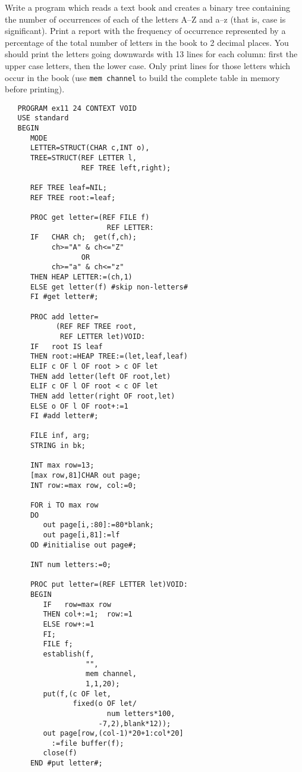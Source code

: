\begin{exercise}
\item Write a program which reads a text book and creates a binary tree
containing the number of occurrences of each of the letters A--Z and
a--z (that is, case is significant). Print a report with the frequency
of occurrence represented by a percentage of the total number of
letters in the book to 2 decimal places. You should print the letters
going downwards with 13 lines for each column: first the upper case
letters, then the lower case. Only print lines for those letters which
occur in the book (use \verb|mem channel| to build the complete table in
memory before printing).\ans \ %
\begin{verbatim}
   PROGRAM ex11 24 CONTEXT VOID
   USE standard
   BEGIN
      MODE
      LETTER=STRUCT(CHAR c,INT o),
      TREE=STRUCT(REF LETTER l,
                  REF TREE left,right);

      REF TREE leaf=NIL;
      REF TREE root:=leaf;

      PROC get letter=(REF FILE f)
                        REF LETTER:
      IF   CHAR ch;  get(f,ch);
           ch>="A" & ch<="Z"
                  OR
           ch>="a" & ch<="z"
      THEN HEAP LETTER:=(ch,1)
      ELSE get letter(f) #skip non-letters#
      FI #get letter#;

      PROC add letter=
            (REF REF TREE root,
             REF LETTER let)VOID:
      IF   root IS leaf
      THEN root:=HEAP TREE:=(let,leaf,leaf)
      ELIF c OF l OF root > c OF let
      THEN add letter(left OF root,let)
      ELIF c OF l OF root < c OF let
      THEN add letter(right OF root,let)
      ELSE o OF l OF root+:=1
      FI #add letter#;

      FILE inf, arg;
      STRING in bk;

      INT max row=13;
      [max row,81]CHAR out page;
      INT row:=max row, col:=0;

      FOR i TO max row
      DO
         out page[i,:80]:=80*blank;
         out page[i,81]:=lf
      OD #initialise out page#;

      INT num letters:=0;

      PROC put letter=(REF LETTER let)VOID:
      BEGIN
         IF   row=max row
         THEN col+:=1;  row:=1
         ELSE row+:=1
         FI;
         FILE f;
         establish(f,
                   "",
                   mem channel,
                   1,1,20);
         put(f,(c OF let,
                fixed(o OF let/
                        num letters*100,
                      -7,2),blank*12));
         out page[row,(col-1)*20+1:col*20]
           :=file buffer(f);
         close(f)
      END #put letter#;


\end{verbatim}
\end{exercise}
